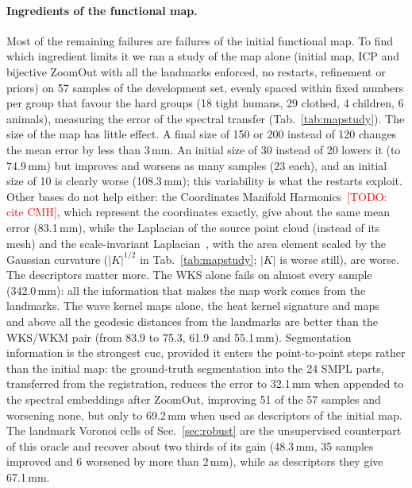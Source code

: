 \documentclass[11pt]{article}
\newcommand{\todo}[1]{\textcolor{red}{[TODO: #1]}}
\begin{document}
\paragraph{Ingredients of the functional map.} Most of the remaining
failures are failures of the initial functional map. To find which
ingredient limits it we ran a study of the map alone (initial map, ICP and
bijective ZoomOut with all the landmarks enforced, no restarts, refinement
or priors) on 57 samples of the development set, evenly spaced within
fixed numbers per group that favour the hard groups (18 tight humans, 29
clothed, 4 children, 6 animals), measuring the error of the spectral
transfer (Tab.~\ref{tab:mapstudy}). The size of the map has little effect.
A final size of 150 or 200 instead of 120 changes the mean error by less
than 3\,mm. An initial size of 30 instead of 20 lowers it (to 74.9\,mm) but
improves and worsens as many samples (23 each), and an initial size of 10
is clearly worse (108.3\,mm); this variability is what the restarts exploit.
Other bases do not help either: the Coordinates Manifold
Harmonics~\todo{cite CMH}, which represent the coordinates exactly, give
about the same mean error (83.1\,mm), while the Laplacian
of the source point cloud (instead of its mesh) and the scale-invariant
Laplacian~\citep{aflalo2013scale}, with the area element scaled by the
Gaussian curvature ($|K|^{1/2}$ in Tab.~\ref{tab:mapstudy}; $|K|$ is worse
still), are worse. The descriptors matter more. The WKS alone fails on almost every
sample (342.0\,mm): all the information that makes the map work comes from the landmarks. The
wave kernel maps alone, the heat kernel signature and maps~\citep{sun2009concise}
and above all the geodesic distances from the landmarks are better than the
WKS/WKM pair (from 83.9 to 75.3, 61.9 and 55.1\,mm). Segmentation
information is the strongest cue, provided it enters the point-to-point
steps rather than the initial map: the ground-truth segmentation into the 24
SMPL parts, transferred from the registration, reduces the error to 32.1\,mm
when appended to the spectral embeddings after ZoomOut, improving 51 of the 57
samples and worsening none, but only to 69.2\,mm when used as descriptors of
the initial map. The landmark Voronoi cells of Sec.~\ref{sec:robust} are the
unsupervised counterpart of this oracle and recover about two thirds of its
gain (48.3\,mm, 35 samples improved and 6 worsened by more than 2\,mm), while
as descriptors they give 67.1\,mm.
\end{document}
